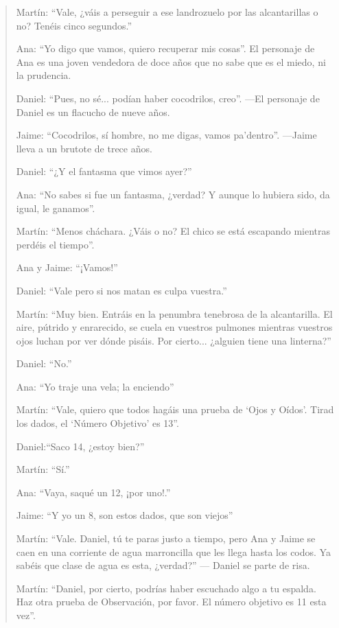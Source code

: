 \begin{quotation}

Martín: \enquote{Vale, ¿váis a perseguir a ese landrozuelo por las alcantarillas o no? Tenéis cinco segundos.}

Ana: \enquote{Yo digo que vamos, quiero recuperar mis cosas}. El personaje de Ana es una joven vendedora de doce años que no sabe que es el miedo, ni la prudencia.

Daniel: \enquote{Pues, no sé... podían haber cocodrilos, creo}. ---El personaje de Daniel es un flacucho de nueve años.

Jaime: \enquote{Cocodrilos, sí hombre, no me digas, vamos pa'dentro}. ---Jaime lleva a un brutote de trece años.

Daniel: \enquote{¿Y el fantasma que vimos ayer?}

Ana: \enquote{No sabes si fue un fantasma, ¿verdad? Y aunque lo hubiera sido, da igual, le ganamos}.

Martín: \enquote{Menos cháchara. ¿Váis o no? El chico se está escapando mientras perdéis el tiempo}.

Ana y Jaime: \enquote{¡Vamos!}

Daniel: \enquote{Vale pero si nos matan es culpa vuestra.}

Martín: \enquote{Muy bien. Entráis en la penumbra tenebrosa de la alcantarilla. El aire, pútrido y enrarecido, se cuela en vuestros pulmones mientras vuestros ojos luchan por ver dónde pisáis. Por cierto... ¿alguien tiene una linterna?}

Daniel: \enquote{No.}

Ana: \enquote{Yo traje una vela; la enciendo}

Martín: \enquote{Vale, quiero que todos hagáis una prueba de \enquote{Ojos y Oídos}. Tirad los dados, el \enquote{Número Objetivo} es 13}.

Daniel:\enquote{Saco 14, ¿estoy bien?}

Martín: \enquote{Sí.}

Ana: \enquote{Vaya, saqué un 12, ¡por uno!.}

Jaime: \enquote{Y yo un 8, son estos dados, que son viejos}

Martín: \enquote{Vale. Daniel, tú te paras justo a tiempo, pero Ana y Jaime se caen en una corriente de agua marroncilla que les llega hasta los codos. Ya sabéis que clase de agua es esta, ¿verdad?} --- Daniel se parte de risa.

Martín: \enquote{Daniel, por cierto, podrías haber escuchado algo a tu espalda. Haz otra prueba de Observación, por favor. El número objetivo es 11 esta vez}.


\end{quotation}
